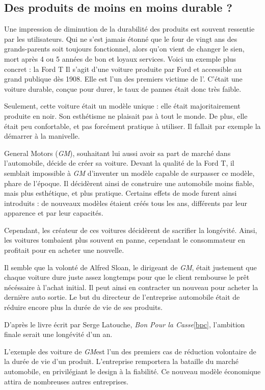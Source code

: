 \subsection{Des produits de moins en moins durable ?}

Une impression de diminution de la durabilité des produits est souvent ressentie par les utilisateurs.  Qui ne s'est jamais étonné que le four de vingt ans des grands-parents soit toujours fonctionnel, alors qu'on vient de changer le sien, mort après 4 ou 5 années de bon et loyaux services. 
\smallbreak
Voici un exemple plus concret : la Ford T
Il s'agit d'une voiture produite par Ford et accessible au grand publique dès 1908.
Elle est l'un des premiers victime de l'\op.
C'était une voiture durable, conçue pour durer, le taux de pannes était donc très faible.   

Seulement, cette voiture était un modèle unique : elle était majoritairement produite en noir. Son esthétisme ne plaisait pas à tout le monde. De plus, elle était peu confortable, et pas forcément pratique à utiliser. Il fallait par exemple la démarrer à la manivelle. 

General Motors (\textit{GM}), souhaitant lui aussi avoir sa part de marché dans l'automobile, décide de créer sa voiture.
Devant la qualité de la Ford T, il semblait impossible à \textit{GM} d'inventer un modèle capable de surpasser ce modèle, phare de l'époque.
Il décidèrent ainsi de construire une automobile moins fiable, mais plus esthétique, et plus pratique.
Certains effets de mode furent ainsi introduits : de nouveaux modèles étaient créés tous les ans, différents par leur apparence et par leur capacités.

Cependant, les créateur de ces voitures décidèrent de sacrifier la longévité. Ainsi, les voitures tombaient plus souvent en panne, cependant le consommateur en profitait pour en acheter une nouvelle.

Il semble que la volonté de Alfred Sloan, le dirigeant de \textit{GM}, était justement que chaque voiture dure juste assez longtemps pour que le client rembourse le prêt nécéssaire à l'achat initial.
Il peut ainsi en contracter un nouveau pour acheter la dernière auto sortie. Le but du directeur de l'entreprise automobile était de réduire encore plus la durée de vie de ses produits.

D'après le livre écrit par Serge Latouche, \textit{Bon Pour la Casse}\ref{bpc}, l'ambition finale serait une longévité d'un an.

\smallbreak
L'exemple des voiture de \textit{GM}est l'un des premiers cas de réduction volontaire de la durée de vie d'un produit. L'entreprise remportera la bataille du marché automobile, en privilégiant le design à la fiabilité. Ce nouveau modèle économique attira de nombreuses autres entreprises. 

